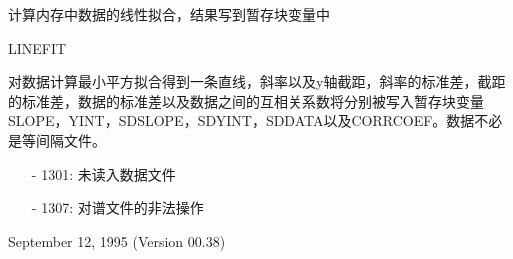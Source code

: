 \label{cmd:linefit}

计算内存中数据的线性拟合，结果写到暂存块变量中

LINEFIT

对数据计算最小平方拟合得到一条直线，斜率以及y轴截距，斜率的标准差，截距的标准差，数据的标准差以及数据之间的互相关系数将分别被写入暂存块变量SLOPE，YINT，SDSLOPE，SDYINT，SDDATA以及CORRCOEF。数据不必是等间隔文件。

\begin{itemize}
\item[-]1301: 未读入数据文件
\item[-]1307: 对谱文件的非法操作
\end{itemize}

September 12, 1995 (Version 00.38)
